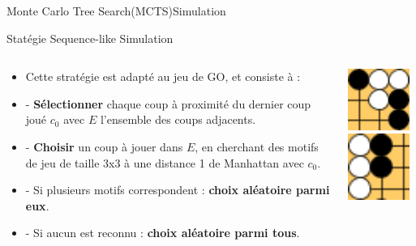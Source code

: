 \begin{frame}{Monte Carlo Tree Search(MCTS)}{Simulation}
	\begin{block}{Statégie Sequence-like Simulation}
		\begin{columns}
			\begin{column}{8cm}
				\begin{itemize}
					\item Cette stratégie est adapté au jeu de GO, et consiste à :
					\item - \textbf{Sélectionner} chaque coup à proximité du dernier coup joué $c_{0}$ avec $E$ l'ensemble des coups adjacents.
					\item - \textbf{Choisir} un coup à jouer dans $E$, en cherchant des motifs de jeu de taille 3x3 à une distance 1 de Manhattan avec $c_{0}$.
					\item - Si plusieurs motifs correspondent :
					      \textbf{choix aléatoire parmi eux}.
					\item - Si aucun est reconnu :
					      \textbf{choix aléatoire parmi tous}.
				\end{itemize}
			\end{column}
			\begin{column}{3cm}
				\vspace{1cm}
				\includegraphics[width=2cm]{ressources/MCTS/3x3GridGo.png}
				\includegraphics[width=2cm]{ressources/MCTS/3x3GridGo2.png}
			\end{column}
		\end{columns}
	\end{block}\end{frame}

